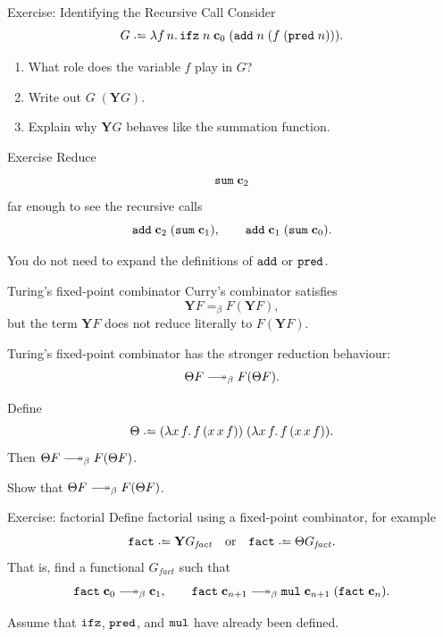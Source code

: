\begin{frame}{Exercise: Identifying the Recursive Call}
  Consider
  \[
    G \defeq
    \lambda f\,n.\,
      \ifz\;n\;\bc_0\;
        (\add\;n\;(f\;(\pred\;n))).
  \]

  \begin{enumerate}
    \item What role does the variable $f$ play in $G$?
    \item Write out $G\;(\mathbf{Y}G)$.
    \item Explain why $\mathbf{Y}G$ behaves like the summation function.
  \end{enumerate}
\end{frame}

\begin{frame}{Exercise}
      Reduce
  \[
    \mathtt{sum}\;\mathbf{c}_2
  \]
  far enough to see the recursive calls
  \[
    \mathtt{add}\;\mathbf{c}_2\;(\mathtt{sum}\;\mathbf{c}_1),
    \qquad
    \mathtt{add}\;\mathbf{c}_1\;(\mathtt{sum}\;\mathbf{c}_0).
  \]

  You do not need to expand the definitions of $\mathtt{add}$ or $\mathtt{pred}$.
\end{frame}

\begin{frame}{Turing's fixed-point combinator}
  Curry's combinator satisfies
  \[
    \mathbf{Y}F =_\beta F(\mathbf{Y}F),
  \]
  but the term $\mathbf{Y}F$ does not reduce literally to $F(\mathbf{Y}F)$.

  Turing's fixed-point combinator has the stronger reduction behaviour:
  \[
    \Theta F \reduce F(\Theta F).
  \]

  \begin{proposition}
    Define
    \[
      \Theta \defeq
      (\lambda x\,f.\,f\,(x\,x\,f))\;
      (\lambda x\,f.\,f\,(x\,x\,f)).
    \]
    Then $\Theta F \reduce F(\Theta F)$.
  \end{proposition}

  \begin{exercise*}
    Show that $\Theta F \reduce F(\Theta F)$.
  \end{exercise*}
\end{frame}

\begin{frame}{Exercise: factorial}
  Define factorial using a fixed-point combinator, for example
  \[
    \mathtt{fact} \defeq \mathbf{Y}G_{\mathit{fact}}
    \quad\text{or}\quad
    \mathtt{fact} \defeq \Theta G_{\mathit{fact}}.
  \]
  That is, find a functional $G_{\mathit{fact}}$ such that
  \[
    \mathtt{fact}\;\bc_0 \reduce \bc_1,
    \qquad
    \mathtt{fact}\;\bc_{n+1}
      \reduce
      \mul\;\bc_{n+1}\;(\mathtt{fact}\;\bc_n).
  \]

  Assume that $\mathtt{ifz}$, $\mathtt{pred}$, and $\mathtt{mul}$ have already been defined.
\end{frame}

